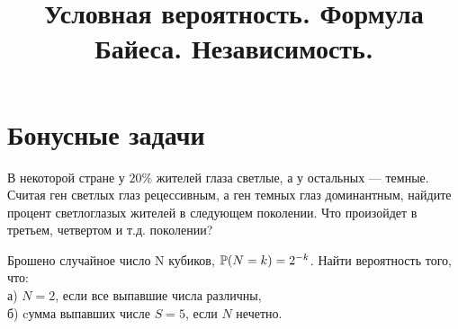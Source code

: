 

\title{Условная вероятность. Формула Байеса. Независимость.} 
\date{\vspace{-1cm}}


\maketitle

\section*{Бонусные задачи}
\begin{problem}
    В некоторой стране у $20\%$ жителей глаза светлые, а у остальных — темные.
    Считая ген светлых глаз рецессивным, а ген темных глаз доминантным, найдите процент светлоглазых жителей в следующем поколении.
    Что произойдет в третьем, четвертом и т.д. поколении?
\end{problem}

\begin{problem}
    Брошено случайное число N кубиков, $\operatorname{\mathbb{P}}(N = k) = 2^{-k}$.
    Найти вероятность того, что:\\
    а) $N = 2$, если все выпавшие числа различны,\\
    б) cумма выпавших числе $S = 5$, если $N$ нечетно.
\end{problem}



